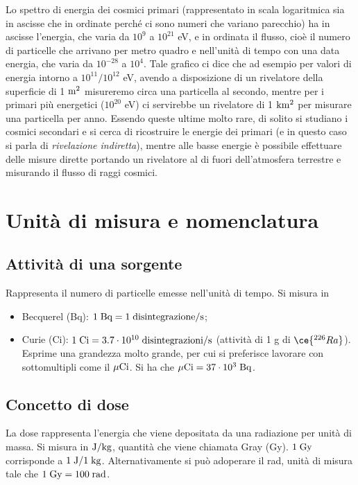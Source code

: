 \vspace{0.4cm}Lo spettro di energia dei cosmici primari (rappresentato in scala logaritmica sia in ascisse che in ordinate perché ci sono numeri che variano parecchio) ha in ascisse l'energia, che varia da $10^9$ a $10^{21}$ eV, e in ordinata il flusso, cioè il numero di particelle che arrivano per metro quadro e nell'unità di tempo con una data energia, che varia da $10^{-28}$ a $10^4$. Tale grafico ci dice che ad esempio per valori di energia intorno a $10^{11}/10^{12}$ eV, avendo a disposizione di un rivelatore della superficie di 1 $\rm m^2$ misureremo circa una particella al secondo, mentre per i primari più energetici ($10^{20}$ eV) ci servirebbe un rivelatore di 1 $\rm km^2$ per misurare una particella per anno. Essendo queste ultime molto rare, di solito si studiano i cosmici secondari e si cerca di ricostruire le energie dei primari (e in questo caso si parla di \textit{rivelazione indiretta}), mentre alle basse energie è possibile effettuare delle misure dirette portando un rivelatore al di fuori dell'atmosfera terrestre e misurando il flusso di raggi cosmici.

\section{Unità di misura e nomenclatura}

\subsection{Attività di una sorgente}

Rappresenta il numero di particelle emesse nell'unità di tempo. Si misura in

\begin{itemize}[leftmargin=0.5cm]
    \item Becquerel (Bq): $\rm 1 \; Bq=1 \; disintegrazione/s$;
    \item Curie (Ci): $\rm 1 \; Ci=3.7 \cdot 10^{10} \; disintegrazioni/s$ (attività di 1 g di $\ce{^{226}Ra}$). Esprime una grandezza molto grande, per cui si preferisce lavorare con sottomultipli come il $\rm \mu Ci$. Si ha che $\rm \mu Ci=37 \cdot 10^3 \; Bq$.
\end{itemize}

\subsection{Concetto di dose}
La dose rappresenta l'energia che viene depositata da una radiazione per unità di massa. Si misura in $\rm J/kg$, quantità che viene chiamata Gray (Gy). $\rm 1 \; Gy$ corrisponde a $\rm 1 \; J/1 \; kg$. Alternativamente si può adoperare il rad, unità di misura tale che $\rm 1 \; Gy=100 \; rad$.

